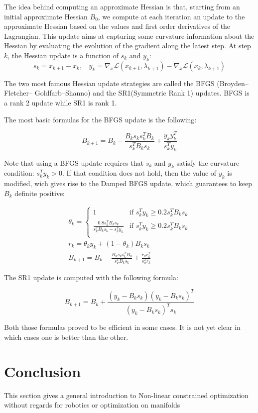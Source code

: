 The idea behind computing an approximate Hessian is that, starting from an initial approximate Hessian $B_0$, we compute at each iteration an update to the approximate Hessian based on the values and first order derivatives of the Lagrangian.
This update aims at capturing some curvature information about the Hessian by evaluating the evolution of the gradient along the latest step.
At step $k$, the Hessian update is a function of $s_k$ and $y_k$:
\begin{equation}
  s_k = x_{k+1}-x_k,\ \ \ \
  y_k = \nabla_x\mathcal{L}(x_{k+1}, \lambda_{k+1}) - \nabla_x\mathcal{L}(x_{k}, \lambda_{k+1})
\end{equation}

The two most famous Hessian update strategies are called the BFGS (Broyden–Fletcher– Goldfarb–Shanno) and the SR1(Symmetric Rank 1) updates.
BFGS is a rank 2 update while SR1 is rank 1.

The most basic formulas for the BFGS update is the following:

\begin{equation}
  \label{BFGS}
  B_{k+1} = B_k - \frac{B_k s_k s_k^T B_k}{s_k^T B_k s_k} + \frac{y_k y_k^T}{s_k^T y_k}
\end{equation}

Note that using a BFGS update requires that $s_k$ and $y_k$ satisfy the curvature condition: $s_k^Ty_k>0$.
If that condition does not hold, then the value of $y_k$ is modified, wich gives rise to the Damped BFGS update, which guarantees to keep $B_k$ definite positive:

\begin{equation}
  \label{damped_BFGS}
\begin{split}
  \theta_k =
  \left\{
      \begin{array}{ll}
      1 & \text{if } s_k^Ty_k \geq 0.2s_k^TB_ks_k \\
      \frac{0.8s_k^TB_ks_k}{s_k^TB_ks_k-s_k^Ty_k} & \text{if } s_k^Ty_k \geq 0.2s_k^TB_ks_k \\
      \end{array}
      \right.\\
      r_k = \theta_k y_k + (1-\theta_k)B_ks_k\\
      B_{k+1} = B_k - \frac{B_k s_k s_k^T B_k}{s_k^T B_k s_k} + \frac{r_k r_k^T}{s_k^T r_k}
\end{split}
\end{equation}

The SR1 update is computed with the following formula:

\begin{equation}
  \label{SR1}
  B_{k+1} = B_k + \frac{(y_k-B_ks_k)(y_k-B_ks_k)^T}{(y_k-B_ks_k)^Ts_k}
\end{equation}

Both those formulas proved to be efficient in some cases. It is not yet clear in which cases one is better than the other.

\section{Conclusion}
This section gives a general introduction to Non-linear constrained optimization without regards for robotics or optimization on manifolds

